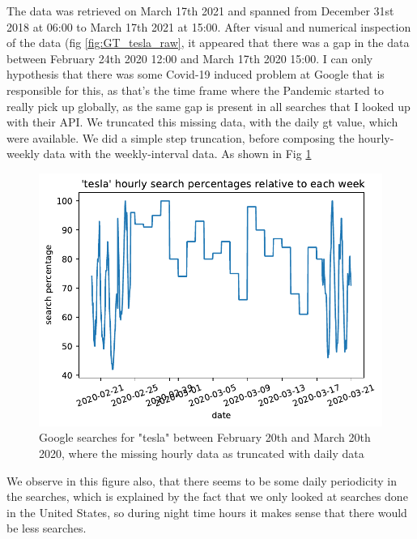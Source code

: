 The data was retrieved on March 17th 2021 and spanned from December 31st 2018 at 06:00 to March 17th 2021 at 15:00.
After visual and numerical inspection of the data (fig \ref{fig:GT_tesla_raw}, it appeared that there was a gap in the data between February 24th 2020 12:00 and March 17th 2020 15:00. I can only hypothesis that there was some Covid-19 induced problem at Google that is responsible for this, as that's the time frame where the Pandemic started to really pick up globally, as the same gap is present in all searches that I looked up with their \Gls{API}. 
We truncated this missing data, with the daily \acrshort{gt} value, which were available. We did a simple step truncation, before composing the hourly-weekly data with the weekly-interval data. As shown in Fig \ref{fig:GT_tesla_probarea}

\begin{figure}[h]
	\centering
	\includegraphics[width=\textwidth]{img/img_GT_tesla_probarea.pdf}
	\caption{Google searches for "tesla" between February 20th and March 20th 2020, where the missing hourly data as truncated with daily data}
	\label{fig:GT_tesla_probarea}
\end{figure}

We observe in this figure also, that there seems to be some daily periodicity in the searches, which is explained by the fact that we only looked at searches done in the United States, so during night time hours it makes sense that there would be less searches.


